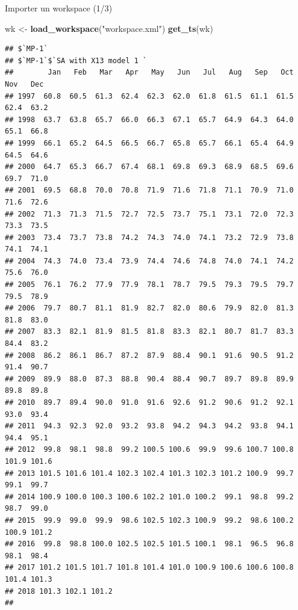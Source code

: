 \documentclass[10pt,xcolor=table,color={dvipsnames,usenames},ignorenonframetext,usepdftitle=false,french]{beamer}
\newenvironment{Shaded}{\begin{snugshade}}{\end{snugshade}}
\newcommand{\KeywordTok}[1]{\textcolor[rgb]{0.13,0.29,0.53}{\textbf{#1}}}
\newcommand{\NormalTok}[1]{#1}
\newcommand{\StringTok}[1]{\textcolor[rgb]{0.31,0.60,0.02}{#1}}
\begin{document}
\begin{frame}[fragile]{Importer un workspace (1/3)}
\protect\hypertarget{importer-un-workspace-13}{}

\footnotesize

\begin{Shaded}
\begin{Highlighting}[]
\NormalTok{wk <-}\StringTok{ }\KeywordTok{load_workspace}\NormalTok{(}\StringTok{"workspace.xml"}\NormalTok{)}
\KeywordTok{get_ts}\NormalTok{(wk)}
\end{Highlighting}
\end{Shaded}

\begin{verbatim}
## $`MP-1`
## $`MP-1`$`SA with X13 model 1 `
##        Jan   Feb   Mar   Apr   May   Jun   Jul   Aug   Sep   Oct   Nov   Dec
## 1997  60.8  60.5  61.3  62.4  62.3  62.0  61.8  61.5  61.1  61.5  62.4  63.2
## 1998  63.7  63.8  65.7  66.0  66.3  67.1  65.7  64.9  64.3  64.0  65.1  66.8
## 1999  66.1  65.2  64.5  66.5  66.7  65.8  65.7  66.1  65.4  64.9  64.5  64.6
## 2000  64.7  65.3  66.7  67.4  68.1  69.8  69.3  68.9  68.5  69.6  69.7  71.0
## 2001  69.5  68.8  70.0  70.8  71.9  71.6  71.8  71.1  70.9  71.0  71.6  72.6
## 2002  71.3  71.3  71.5  72.7  72.5  73.7  75.1  73.1  72.0  72.3  73.3  73.5
## 2003  73.4  73.7  73.8  74.2  74.3  74.0  74.1  73.2  72.9  73.8  74.1  74.1
## 2004  74.3  74.0  73.4  73.9  74.4  74.6  74.8  74.0  74.1  74.2  75.6  76.0
## 2005  76.1  76.2  77.9  77.9  78.1  78.7  79.5  79.3  79.5  79.7  79.5  78.9
## 2006  79.7  80.7  81.1  81.9  82.7  82.0  80.6  79.9  82.0  81.3  81.8  83.0
## 2007  83.3  82.1  81.9  81.5  81.8  83.3  82.1  80.7  81.7  83.3  84.4  83.2
## 2008  86.2  86.1  86.7  87.2  87.9  88.4  90.1  91.6  90.5  91.2  91.4  90.7
## 2009  89.9  88.0  87.3  88.8  90.4  88.4  90.7  89.7  89.8  89.9  89.8  89.8
## 2010  89.7  89.4  90.0  91.0  91.6  92.6  91.2  90.6  91.2  92.1  93.0  93.4
## 2011  94.3  92.3  92.0  93.2  93.8  94.2  94.3  94.2  93.8  94.1  94.4  95.1
## 2012  99.8  98.1  98.8  99.2 100.5 100.6  99.9  99.6 100.7 100.8 101.9 101.6
## 2013 101.5 101.6 101.4 102.3 102.4 101.3 102.3 101.2 100.9  99.7  99.1  99.7
## 2014 100.9 100.0 100.3 100.6 102.2 101.0 100.2  99.1  98.8  99.2  98.7  99.0
## 2015  99.9  99.0  99.9  98.6 102.5 102.3 100.9  99.2  98.6 100.2 100.9 101.2
## 2016  99.8  98.8 100.0 102.5 102.5 101.5 100.1  98.1  96.5  96.8  98.1  98.4
## 2017 101.2 101.5 101.7 101.8 101.4 101.0 100.9 100.6 100.6 100.8 101.4 101.3
## 2018 101.3 102.1 101.2                                                      
## 

\end{verbatim}
\end{frame}
\end{document}
